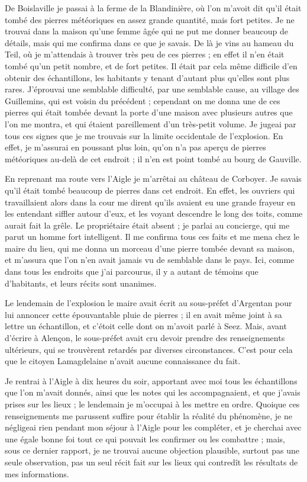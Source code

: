 \documentclass[a4paper, 11pt, oneside, polutonikogreek, french]{article}
\begin{document}
De Boislaville je passai à la ferme de la Blandinière, où l'on m'avoit dit qu'il était tombé des pierres météoriques en assez grande quantité, mais fort petites. Je ne trouvai dans la maison qu'une femme âgée qui ne put me donner beaucoup de détails, mais qui me confirma dans ce que je savais. De là je vins au hameau du Teil, où je m'attendais à trouver très peu de ces pierres ; en effet il n'en était tombé qu'un petit nombre, et de fort petites. Il était par cela même difficile d'en obtenir des échantillons, les habitants y tenant d'autant plus qu'elles sont plus rares. J'éprouvai une semblable difficulté, par une semblable cause, au village des Guillemins, qui est voisin du précédent ; cependant on me donna une de ces pierres qui était tombée devant la porte d'une maison avec plusieurs autres que l'on me montra, et qui étaient pareillement d'un très-petit volume. Je jugeai par tous ces signes que je me trouvais sur la limite occidentale de l'explosion. En effet, je m'assurai en poussant plus loin, qu'on n'a pas aperçu de pierres météoriques au-delà de cet endroit ; il n'en est point tombé au bourg de Gauville.

En reprenant ma route vers l'Aigle je m'arrêtai au château de Corboyer. Je savais qu'il était tombé beaucoup de pierres dans cet endroit. En effet, les ouvriers qui travaillaient alors dans la cour me dirent qu'ils avaient eu une grande frayeur en les entendant siffler autour d'eux, et les voyant descendre le long des toits, comme aurait fait la grêle. Le propriétaire était absent ; je parlai au concierge, qui me parut un homme fort intelligent. Il me confirma tous ces faits et me mena chez le maire du lieu, qui me donna un morceau d'une pierre tombée devant sa maison, et m'assura que l'on n'en avait jamais vu de semblable dans le pays. Ici, comme dans tous les endroits que j'ai parcourus, il y a autant de témoins que d'habitants, et leurs récits sont unanimes.

Le lendemain de l'explosion le maire avait écrit au sous-préfet d'Argentan pour lui annoncer cette épouvantable pluie de pierres ; il en avait même joint à sa lettre un échantillon, et c'étoit celle dont on m'avoit parlé à Seez. Mais, avant d'écrire à Alençon, le sous-préfet avait cru devoir prendre des renseignements ultérieurs, qui se trouvèrent retardés par diverses circonstances. C'est pour cela que le citoyen Lamagdelaine n'avait aucune connaissance du fait.

Je rentrai à l'Aigle à dix heures du soir, apportant avec moi tous les échantillons que l'on m'avait donnés, ainsi que les notes qui les accompagnaient, et que j'avais prises sur les lieux ; le lendemain je m'occupai à les mettre en ordre. Quoique ces renseignements me parussent suffire pour établir la réalité du phénomène, je ne négligeai rien pendant mon séjour à l'Aigle pour les compléter, et je cherchai avec une égale bonne foi tout ce qui pouvait les confirmer ou les combattre ; mais, sous ce dernier rapport, je ne trouvai aucune objection plausible, surtout pas une seule observation, pas un seul récit fait sur les lieux qui contredît les résultats de mes informations.
\end{document}

